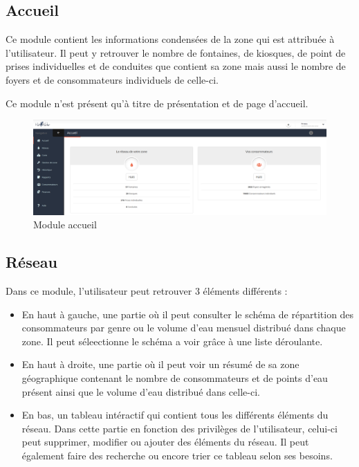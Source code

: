 \documentclass{EPL-master-thesis-covers-FR}
\begin{document}
			\subsection{Accueil}
				Ce module contient les informations condensées de la zone qui est attribuée à l'utilisateur. Il peut y retrouver le nombre de fontaines, de kiosques, de point de prises individuelles et de conduites que contient sa zone mais aussi le nombre de foyers et de consommateurs individuels de celle-ci. 
				
				Ce module n'est présent qu'à titre de présentation et de page d'accueil.
				
				\begin{figure}[H]
					\centering
					\includegraphics[width=1\textwidth]{images/Accueil}
					\caption{Module accueil}
				\end{figure}
				
				
			\subsection{Réseau}
				Dans ce module, l'utilisateur peut retrouver 3 éléments différents :
				\begin{itemize}
					\item En haut à gauche, une partie où il peut consulter le schéma de répartition des consommateurs par genre ou le volume d'eau mensuel distribué dans chaque zone. Il peut séleectionne le schéma a voir grâce à une liste déroulante.
					\item En haut à droite, une partie où il peut voir un résumé de sa zone géographique contenant le nombre de consommateurs et de points d'eau présent ainsi que le volume d'eau distribué dans celle-ci.
					\item En bas, un tableau intéractif qui contient tous les différents éléments du réseau. Dans cette partie en fonction des privilèges de l'utilisateur, celui-ci peut supprimer, modifier ou ajouter des éléments du réseau. Il peut également faire des recherche ou encore trier ce tableau selon ses besoins.
				\end{itemize}
				
\end{document}
